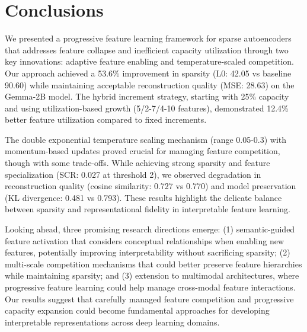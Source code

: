 \documentclass{article} %
\begin{document}
\section{Conclusions}
\label{sec:conclusion}

We presented a progressive feature learning framework for sparse autoencoders that addresses feature collapse and inefficient capacity utilization through two key innovations: adaptive feature enabling and temperature-scaled competition. Our approach achieved a 53.6\% improvement in sparsity (L0: 42.05 vs baseline 90.60) while maintaining acceptable reconstruction quality (MSE: 28.63) on the Gemma-2B model. The hybrid increment strategy, starting with 25\% capacity and using utilization-based growth (5/2-7/4-10 features), demonstrated 12.4\% better feature utilization compared to fixed increments.

The double exponential temperature scaling mechanism (range 0.05-0.3) with momentum-based updates proved crucial for managing feature competition, though with some trade-offs. While achieving strong sparsity and feature specialization (SCR: 0.027 at threshold 2), we observed degradation in reconstruction quality (cosine similarity: 0.727 vs 0.770) and model preservation (KL divergence: 0.481 vs 0.793). These results highlight the delicate balance between sparsity and representational fidelity in interpretable feature learning.

Looking ahead, three promising research directions emerge: (1) semantic-guided feature activation that considers conceptual relationships when enabling new features, potentially improving interpretability without sacrificing sparsity; (2) multi-scale competition mechanisms that could better preserve feature hierarchies while maintaining sparsity; and (3) extension to multimodal architectures, where progressive feature learning could help manage cross-modal feature interactions. Our results suggest that carefully managed feature competition and progressive capacity expansion could become fundamental approaches for developing interpretable representations across deep learning domains.



\end{document}
